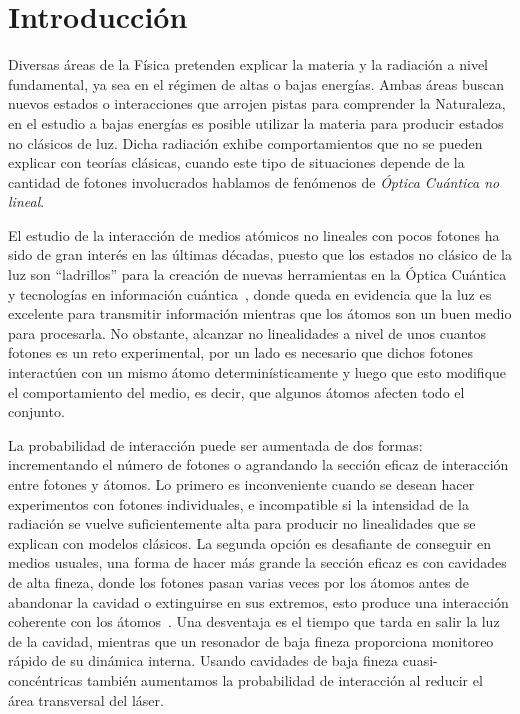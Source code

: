 \chapter{\label{cap:introduccion}Introducción}

Diversas áreas de la Física pretenden explicar la materia y la radiación a nivel fundamental, ya sea en el régimen de altas o bajas energías. Ambas áreas buscan nuevos estados o interacciones que arrojen pistas para comprender la Naturaleza, en el estudio a bajas energías es posible utilizar la materia para producir estados no clásicos de luz. Dicha radiación exhibe comportamientos que no se pueden explicar con teorías clásicas, cuando este tipo de situaciones depende de la cantidad de fotones involucrados hablamos de fenómenos de \emph{Óptica Cuántica no lineal}.

\p El estudio de la interacción de medios atómicos no lineales con pocos fotones ha sido de gran interés en las últimas décadas, puesto que los estados no clásico de la luz son ``ladrillos'' para la creación de nuevas herramientas en la Óptica Cuántica y tecnologías en información cuántica~\cite{chen,gorniaczyk,tiarks}, donde queda en evidencia que la luz es excelente para transmitir información mientras que los átomos son un buen medio para procesarla. No obstante, alcanzar no linealidades a nivel de unos cuantos fotones es un reto experimental, por un lado es necesario que dichos fotones interactúen con un mismo átomo determinísticamente y luego que esto modifique el comportamiento del medio, es decir, que algunos átomos afecten todo el conjunto.

\p La probabilidad de interacción puede ser aumentada de dos formas: incrementando el número de fotones o agrandando la sección eficaz de interacción entre fotones y átomos. Lo primero es inconveniente cuando se desean hacer experimentos con fotones individuales, e incompatible si la intensidad de la radiación se vuelve suficientemente alta para producir no linealidades que se explican con modelos clásicos. La segunda opción es desafiante de conseguir en medios usuales, una forma de hacer más grande la sección eficaz es con cavidades de alta fineza, donde los fotones pasan varias veces por los átomos antes de abandonar la cavidad o extinguirse en sus extremos, esto produce una interacción coherente con los átomos~\cite{haroche, birnbaum}. Una desventaja es el tiempo que tarda en salir la luz de la cavidad, mientras que un resonador de baja fineza proporciona monitoreo rápido de su dinámica interna. Usando cavidades de baja fineza cuasi-concéntricas también aumentamos la probabilidad de interacción al reducir el área transversal del láser.

